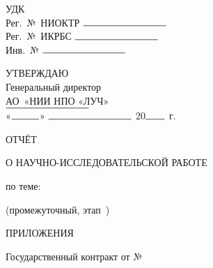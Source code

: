 
\thispagestyle{empty}
\loochHat

\vspace{1cm}

\noindent
\begin{minipage}{0.45\textwidth}
УДК\\
Рег.~№~НИОКТР \(\rule{3cm}{0.5pt}\)\\
Рег.~№~ИКРБС  \(\rule{3cm}{0.5pt}\)\\
Инв.~№ \(\rule{3cm}{0.5pt}\)
\end{minipage}\hfill
\begin{minipage}{0.45\textwidth}
УТВЕРЖДАЮ\\
Генеральный директор    \\   
АО~«НИИ НПО «ЛУЧ»\\
\(\rule{3cm}{0.5pt}\) \loochDir \\
«\(\rule{1cm}{0.5pt}\)»   \(\rule{3cm}{0.5pt}\) 20\(\rule{0.7cm}{0.5pt}\) г.
\end{minipage}

\vspace{1cm}

\begin{center}
ОТЧЁТ

О НАУЧНО-ИССЛЕДОВАТЕЛЬСКОЙ РАБОТЕ

\vspace{0.8cm}

\loochIntmRepTitle

по теме:

\loochIntmRepSubTitle
 
(промежуточный, этап~\loochIntmRepNum)

\vspace{0.8cm}


ПРИЛОЖЕНИЯ

\vspace{0.8cm}

\loochIntmRepCode

Государственный контракт от \loochIntmRepContractDate{} №~\loochIntmRepContractNum
\end{center}

\vspace{2cm}

